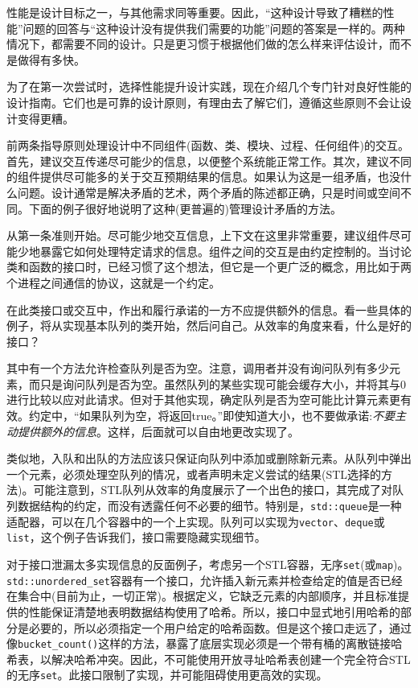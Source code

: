 
性能是设计目标之一，与其他需求同等重要。因此，“这种设计导致了糟糕的性能”问题的回答与“这种设计没有提供我们需要的功能”问题的答案是一样的。两种情况下，都需要不同的设计。只是更习惯于根据他们做的怎么样来评估设计，而不是做得有多快。

为了在第一次尝试时，选择性能提升设计实践，现在介绍几个专门针对良好性能的设计指南。它们也是可靠的设计原则，有理由去了解它们，遵循这些原则不会让设计变得更糟。 

前两条指导原则处理设计中不同组件(函数、类、模块、过程、任何组件)的交互。首先，建议交互传递尽可能少的信息，以便整个系统能正常工作。其次，建议不同的组件提供尽可能多的关于交互预期结果的信息。如果认为这是一组矛盾，也没什么问题。设计通常是解决矛盾的艺术，两个矛盾的陈述都正确，只是时间或空间不同。下面的例子很好地说明了这种(更普遍的)管理设计矛盾的方法。


从第一条准则开始。尽可能少地交互信息，上下文在这里非常重要，建议组件尽可能少地暴露它如何处理特定请求的信息。组件之间的交互是由约定控制的。当讨论类和函数的接口时，已经习惯了这个想法，但它是一个更广泛的概念，用比如于两个进程之间通信的协议，这就是一个约定。 

在此类接口或交互中，作出和履行承诺的一方不应提供额外的信息。看一些具体的例子，将从实现基本队列的类开始，然后问自己。从效率的角度来看，什么是好的接口？

其中有一个方法允许检查队列是否为空。注意，调用者并没有询问队列有多少元素，而只是询问队列是否为空。虽然队列的某些实现可能会缓存大小，并将其与0进行比较以应对此请求。但对于其他实现，确定队列是否为空可能比计算元素更有效。约定中，“如果队列为空，将返回true。”即使知道大小，也不要做承诺:\textit{不要主动提供额外的信息}。这样，后面就可以自由地更改实现了。 

类似地，入队和出队的方法应该只保证向队列中添加或删除新元素。从队列中弹出一个元素，必须处理空队列的情况，或者声明未定义尝试的结果(STL选择的方法)。可能注意到，STL队列从效率的角度展示了一个出色的接口，其完成了对队列数据结构的约定，而没有透露任何不必要的细节。特别是，\texttt{std::queue}是一种适配器，可以在几个容器中的一个上实现。队列可以实现为\texttt{vector}、\texttt{deque}或\texttt{list}，这个例子告诉我们，接口需要隐藏实现细节。

对于接口泄漏太多实现信息的反面例子，考虑另一个STL容器，无序\texttt{set}(或\texttt{map})。\texttt{std::unor\break dered\_set}容器有一个接口，允许插入新元素并检查给定的值是否已经在集合中(目前为止，一切正常)。根据定义，它缺乏元素的内部顺序，并且标准提供的性能保证清楚地表明数据结构使用了哈希。所以，接口中显式地引用哈希的部分是必要的，所以必须指定一个用户给定的哈希函数。但是这个接口走远了，通过像\texttt{bucket\_count()}这样的方法，暴露了底层实现必须是一个带有桶的离散链接哈希表，以解决哈希冲突。因此，不可能使用开放寻址哈希表创建一个完全符合STL的无序\texttt{set}。此接口限制了实现，并可能阻碍使用更高效的实现。

